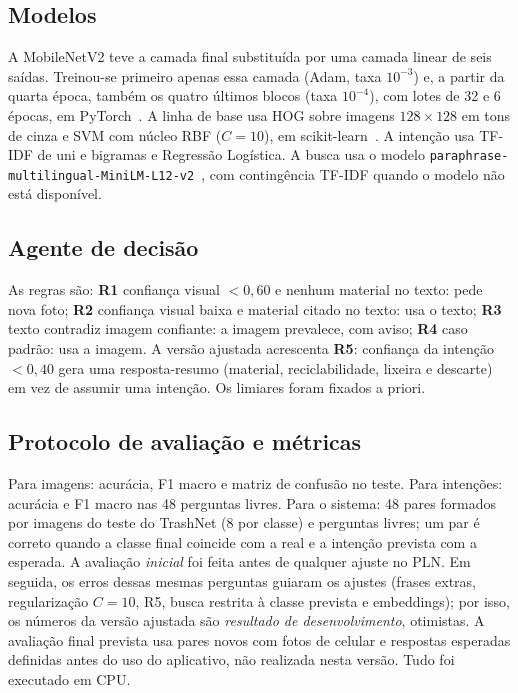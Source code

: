 \documentclass[conference]{IEEEtran}
\begin{document}
\subsection{Modelos}
A MobileNetV2 teve a camada final substitu\'ida por uma camada linear de seis sa\'idas. Treinou-se primeiro apenas essa camada (Adam, taxa $10^{-3}$) e, a partir da quarta \'epoca, tamb\'em os quatro \'ultimos blocos (taxa $10^{-4}$), com lotes de 32 e 6 \'epocas, em PyTorch~\cite{paszke2019}. A linha de base usa HOG sobre imagens $128\times128$ em tons de cinza e SVM com n\'ucleo RBF ($C=10$), em scikit-learn~\cite{pedregosa2011}. A inten\c{c}\~ao usa TF-IDF de uni e bigramas e Regress\~ao Log\'istica. A busca usa o modelo \texttt{paraphrase-multilingual-MiniLM-L12-v2}~\cite{reimers2019}, com contingência TF-IDF quando o modelo n\~ao est\'a dispon\'ivel.

\subsection{Agente de decis\~ao}
As regras s\~ao: \textbf{R1} confian\c{c}a visual $<0{,}60$ e nenhum material no texto: pede nova foto; \textbf{R2} confian\c{c}a visual baixa e material citado no texto: usa o texto; \textbf{R3} texto contradiz imagem confiante: a imagem prevalece, com aviso; \textbf{R4} caso padr\~ao: usa a imagem. A vers\~ao ajustada acrescenta \textbf{R5}: confian\c{c}a da inten\c{c}\~ao $<0{,}40$ gera uma resposta-resumo (material, reciclabilidade, lixeira e descarte) em vez de assumir uma inten\c{c}\~ao. Os limiares foram fixados a priori.

\subsection{Protocolo de avalia\c{c}\~ao e m\'etricas}
Para imagens: acur\'acia, F1 macro e matriz de confus\~ao no teste. Para inten\c{c}\~oes: acur\'acia e F1 macro nas 48 perguntas livres. Para o sistema: 48 pares formados por imagens do teste do TrashNet (8 por classe) e perguntas livres; um par \'e correto quando a classe final coincide com a real e a inten\c{c}\~ao prevista com a esperada. A avalia\c{c}\~ao \emph{inicial} foi feita antes de qualquer ajuste no PLN. Em seguida, os erros dessas mesmas perguntas guiaram os ajustes (frases extras, regulariza\c{c}\~ao $C=10$, R5, busca restrita \`a classe prevista e embeddings); por isso, os n\'umeros da vers\~ao ajustada s\~ao \emph{resultado de desenvolvimento}, otimistas. A avalia\c{c}\~ao final prevista usa pares novos com fotos de celular e respostas esperadas definidas antes do uso do aplicativo, n\~ao realizada nesta vers\~ao. Tudo foi executado em CPU.
\end{document}
